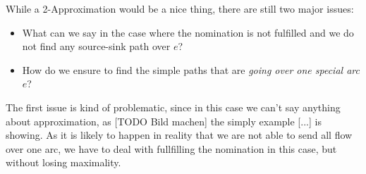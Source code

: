 While a 2-Approximation would be a nice thing, there are still two major issues: 
\begin{itemize}
 \item What can we say in the case where the nomination is not fulfilled and we do not find any source-sink path over 
$e$?
 \item How do we ensure to find the simple paths that are \textit{going over one special arc $e$}? 
\end{itemize}

The first issue is kind of problematic, since in this case we can't say anything about approximation, as [TODO Bild 
machen] the simply example [...] is showing. As it is likely to happen in reality that we are not able to send all flow 
over one arc, we have to deal with fullfilling the nomination in this case, but without losing maximality. 
